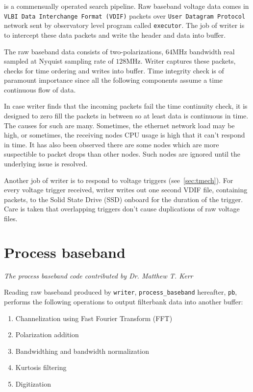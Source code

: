 \par \vf is a commensually operated search pipeline. Raw baseband voltage data comes in \texttt{VLBI Data Interchange Format (VDIF)} packets over
\texttt{User Datagram Protocol} network sent by observatory level program called \texttt{executor}. The job of writer is to intercept these data packets and write the header and data into \dada buffer.

\par The raw baseband data consists of two-polarizations, $64$MHz bandwidth real sampled at Nyquist sampling rate of $128$MHz. Writer captures these packets, checks for time ordering and writes into \dada buffer. Time integrity check is of paramount importance since all the following components assume a time continuous flow of data. 

\par In case writer finds that the incoming packets fail the time continuity check, it is designed to zero fill the packets in between so at least data is continuous in time. The causes for such are many. 
Sometimes, the ethernet network load may be high, or sometimes, the receiving nodes CPU usage is high that it can't respond in time. 
It has also been observed there are some nodes which are more suspectible to packet drops than other nodes. Such nodes are ignored until the underlying issue is resolved. 

\par Another job of writer is to respond to voltage triggers (see~\autoref{sec:tmech}). For every voltage trigger received, writer writes out one second VDIF file, containing packets, to the Solid State Drive (SSD) onboard for the duration of the trigger. Care is taken that overlapping triggers don't cause duplications of raw voltage files.

\section {Process baseband} 
\hfill \emph {The process baseband code contributed by Dr. Matthew T. Kerr}

\par Reading raw baseband produced by \texttt{writer}, \texttt{process\_baseband} hereafter, \texttt{pb}, performs the following operations to output filterbank data into another \dada buffer:

\begin{enumerate}
\item Channelization using Fast Fourier Transform (FFT)
\item Polarization addition
\item Bandwidthing and bandwidth normalization
\item Kurtosis filtering
\item Digitization
\end{enumerate}

